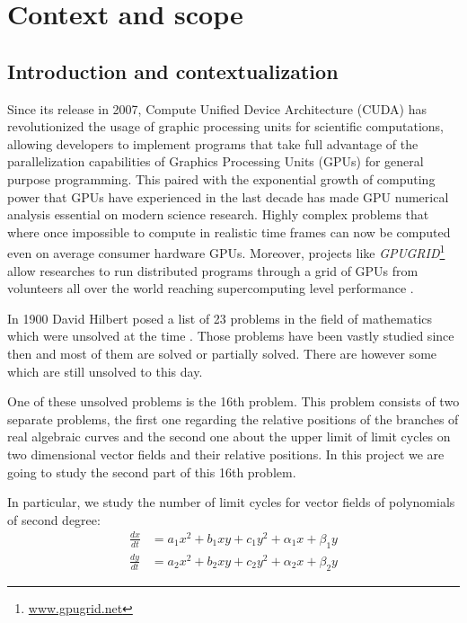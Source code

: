 
\section{Context and scope}%
\label{sec:context}

\subsection{Introduction and contextualization}%
\label{sub:intro}

Since its release in 2007, Compute Unified Device Architecture (CUDA) has
revolutionized the usage of graphic processing units for scientific
computations, allowing developers to implement programs that take full advantage
of the parallelization capabilities of Graphics Processing Units (GPUs) for
general purpose programming.  This paired with the exponential growth of
computing power that GPUs have experienced in the last decade has made GPU
numerical analysis essential on modern science research. Highly complex problems
that where once impossible to compute in realistic time frames can now be
computed even on average consumer hardware GPUs. Moreover, projects like
\emph{GPUGRID}\footnote{\url{www.gpugrid.net}} allow researches to run
distributed programs through a grid of GPUs from volunteers all over the world
reaching supercomputing level performance \cite{antaviana_nvidia_2008}.

In 1900 David Hilbert posed a list of 23 problems in the field of mathematics
which were unsolved at the time
\cite{hilbert_mathematische_1900,hilbert_mathematical_1902}.  Those
problems have been vastly studied since then and most of them are solved or
partially solved. There are however some which are still unsolved to this day.

One of these unsolved problems is the 16th problem.  This problem consists of
two separate problems, the first one regarding the relative positions of the
branches of real algebraic curves and the second one about the upper limit of
limit cycles on two dimensional vector fields and their relative positions. In
this project we are going to study the second part of this 16th problem.

In particular, we study the number of limit cycles for vector fields of
polynomials of second degree:
\begin{align}\label{eq:system}
    \frac{dx}{dt} &= a_1x^2 + b_1xy + c_1y^2 + \alpha_1x + \beta_1y \nonumber \\
    \frac{dy}{dt} &= a_2x^2 + b_2xy + c_2y^2 + \alpha_2x + \beta_2y
\end{align}



